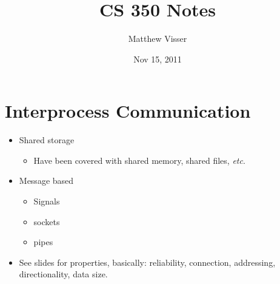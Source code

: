 \documentclass[12pt]{article}
\begin{document}
\title{CS 350 Notes}
\author{Matthew Visser}
\date{Nov 15, 2011}
\maketitle

\section{Interprocess Communication}

\begin{itemize}
	\item Shared storage
		\begin{itemize}
			\item Have been covered with shared memory, shared files,
				\textit{etc}.
		\end{itemize}
	\item Message based
		\begin{itemize}
			\item Signals
			\item sockets
			\item pipes
		\end{itemize}
	\item See slides for properties, basically: reliability, connection,
		addressing, directionality, data size.
\end{itemize}
\end{document}
